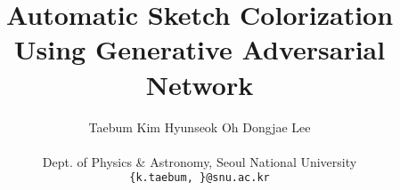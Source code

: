 \documentclass[10pt,twocolumn,letterpaper]{article}
\begin{document}
\title{Automatic Sketch Colorization Using Generative Adversarial Network}

\author{Taebum Kim
\qquad
Hyunseok Oh
\qquad
Dongjae Lee\\
\\
Dept. of Physics \& Astronomy, Seoul National University\\
{\tt\small \{k.taebum, \}@snu.ac.kr}
}

\maketitle

\begin{abstract}
\end{abstract}






{\small


}
\end{document}
